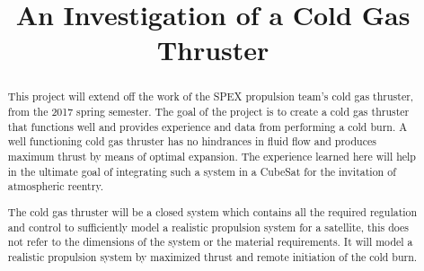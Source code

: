 \documentclass[conference]{IEEEtran} %
\title{An Investigation of a Cold Gas Thruster}
\author{
  \IEEEauthorblockN{%
    James~Emerson~Parkus\IEEEauthorrefmark{1},  %
    David~Breen\IEEEauthorrefmark{2}
  }
  \IEEEauthorblockA{%
    RIT Space Exploration, Rochester Institute of Technology \\ %
    Rochester, N.Y. \\
    Email:
    \IEEEauthorrefmark{1}jep7631@rit.edu,
    \IEEEauthorrefmark{2}djb1410@rit.edu
}


}
\begin{document}
\maketitle%

\begin{abstract}
  This project will extend off the work of the SPEX propulsion team's cold gas thruster, from the 2017 spring semester.
  The goal of the project is to create a cold gas thruster that functions well and provides experience and data from performing a cold burn.
  A well functioning cold gas thruster has no hindrances in fluid flow and produces maximum thrust by means of optimal expansion.
  The experience learned here will help in the ultimate goal of integrating such a system in a CubeSat for the invitation of atmospheric reentry.

The cold gas thruster will be a closed system which contains all the required regulation and control to sufficiently model a realistic propulsion system for a satellite,
this does not refer to the dimensions of the system or the material requirements. It will model a realistic propulsion system by maximized thrust and remote initiation of the cold burn.

\end{abstract}
\end{document}
